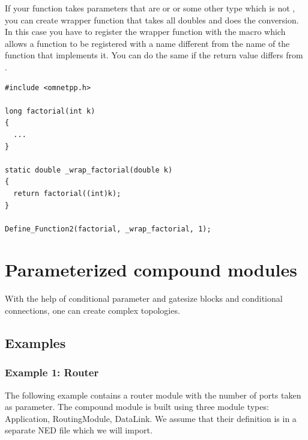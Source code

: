 If your function takes parameters that are  or  or
some other type which is not , you can create wrapper function
that takes all doubles and does the conversion. In this case you have
to register the wrapper function with the  macro
which allows a function to be registered with a name different from the
name of the function that implements it. You can do the same
if the return value differs from .

\begin{verbatim}
#include <omnetpp.h>

long factorial(int k)
{
  ...
}

static double _wrap_factorial(double k)
{
  return factorial((int)k);
}

Define_Function2(factorial, _wrap_factorial, 1);
\end{verbatim}




\section{Parameterized compound modules}


With the help of conditional parameter and gatesize blocks and
conditional connections, one can
create complex topologies.


\subsection{Examples}

\subsubsection{Example 1: Router}

The following example contains a router module with the number of
ports taken as parameter. The compound module is built using three
module types: Application, RoutingModule, DataLink. We assume that
their definition is in a separate NED file which we will import.

